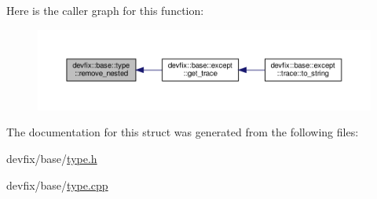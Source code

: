 Here is the caller graph for this function\+:\nopagebreak
\begin{figure}[H]
\begin{center}
\leavevmode
\includegraphics[width=350pt]{structdevfix_1_1base_1_1type_ab0805a0df723803b9e56a8bd63b64dc8_icgraph}
\end{center}
\end{figure}


The documentation for this struct was generated from the following files\+:\begin{DoxyCompactItemize}
\item 
devfix/base/\hyperlink{type_8h}{type.\+h}\item 
devfix/base/\hyperlink{type_8cpp}{type.\+cpp}\end{DoxyCompactItemize}
